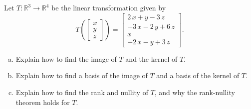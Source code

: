 
\begin{exerciseStatement}
 Let \(T:\mathbb{R}^ 3  \to \mathbb{R}^ 4 \) be the linear transformation given by \[T\left(  \left[\begin{array}{c}
x \\
y \\
z
\end{array}\right]  \right) =  \left[\begin{array}{c}
2 \, x + y - 3 \, z \\
-3 \, x - 2 \, y + 6 \, z \\
x \\
-2 \, x - y + 3 \, z
\end{array}\right] .\]
\begin{enumerate}[(a)]
\item Explain how to find the image of \(T\) and the kernel of \(T\).
\item Explain how to find a basis of the image of \(T\) and a basis of the kernel of \(T\).
\item Explain how to find the rank and nullity of \(T\), and why the rank-nullity theorem holds for \(T\).
\end{enumerate}
    
\end{exerciseStatement}
    
